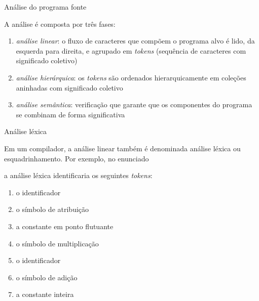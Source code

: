 \begin{frame}[fragile]{Análise do programa fonte}

    A análise é composta por três fases:
    \pause

    \begin{enumerate}
        \item \textit{análise linear}: o fluxo de caracteres que compõem o programa alvo é lido, da esquerda para direita, e agrupado em \textit{tokens} (sequência
            de caracteres com significado coletivo)
        \pause

        \item \textit{análise hierárquica}: os \textit{tokens} são ordenados hierarquicamente em coleções aninhadas com significado coletivo
        \pause

        \item \textit{análise semântica}: verificação que garante que os componentes do programa se combinam de forma significativa
    \end{enumerate}

\end{frame}

\begin{frame}[fragile]{Análise léxica}

    Em um compilador, a análise linear também é denominada análise léxica ou esquadrinhamento.
    \pause
    Por exemplo, no enunciado
        \begin{center}
        \end{center}
    a análise léxica identificaria os seguintes \textit{tokens}:
    \pause
    \vspace{0.1in}

    \begin{enumerate}
        \item o identificador 
        \pause
        \item o símbolo de atribuição 
        \pause
        \item a constante em ponto flutuante 
        \pause
        \item o símbolo de multiplicação 
        \pause
        \item o identificador 
        \pause
        \item o símbolo de adição 
        \pause
        \item a constante inteira 
    \end{enumerate}
\end{frame}

